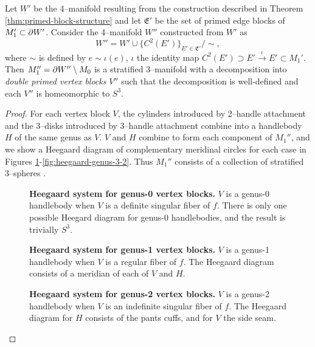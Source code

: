 \begin{cor}
	\label{thm:primed-primed-block-structure}
	Let $W'$ be the 4--manifold resulting from the construction described in Theorem \ref{thm:primed-block-structure} and let $\mathfrak{E}'$ be the set of primed edge blocks of $M_1'\subset\partial W'$.
	Consider the 4--manifold $W''$ constructed from $W'$ as
	\[
	W'' = W'\cup\{C^2(E')\}_{E'\in \mathfrak{E}'} / \sim,
	\]
	where $\sim$ is defined by $e\sim \iota(e)$, $\iota$ the identity map $C^2(E')\supset E'\overset{\iota}{\to} E'\subset M_1'$.
	Then $M_1''=\partial W''\setminus M_0$ is a stratified 3--manifold with a decomposition into \emph{double primed vertex blocks} $V''$ such that the decomposition is well-defined and each $V''$ is homeomorphic to $S^3$.
\end{cor}

\begin{proof}
	For each vertex block $V$, the cylinders introduced by 2--handle attachment and the 3--disks introduced by 3--handle attachment combine into a handlebody $H$ of the same genus as $V$.
	$V$ and $H$ combine to form each component of $M_1''$, and we show a Heegaard diagram of complementary meridinal circles for each case in Figures \ref{fig:heegaard-genus-0}-\ref{fig:heegaard-genus-3-2}.
	Thus $M_1''$ consists of a collection of stratified 3--spheres \cite{SchlWald}.
	
	\begin{figure}[h!]
		\caption{
			\textbf{Heegaard system for genus-0 vertex blocks.}
			$V$ is a genus-0 handlebody when $V$ is a definite singular fiber of $f$.
			There is only one possible Heegard diagram for genus-0 handlebodies, and the result is trivially $S^3$.
		}
		\label{fig:heegaard-genus-0}
	\end{figure}

	\begin{figure}[h!]
		\caption{
			\textbf{Heegaard system for genus-1 vertex blocks.}
			$V$ is a genus-1 handlebody when $V$ is a regular fiber of $f$.
			The Heegaard diagram consists of a meridian of each of $V$ and $H$.
		}
		\label{fig:heegaard-genus-1}
	\end{figure}

	\begin{figure}[h!]
		\caption{
			\textbf{Heegaard system for genus-2 vertex blocks.}
			$V$ is a genus-2 handlebody when $V$ is an indefinite singular fiber of $f$.
			The Heegaard diagram for $H$ consists of the pants cuffs, and for $V$ the side seam.
		}
		\label{fig:heegaard-genus-2}
	\end{figure}


\end{proof}
